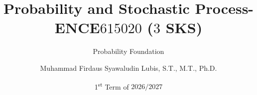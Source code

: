 \title[]{Probability and Stochastic Process-ENCE$615020$ ($3$ SKS)}
\subtitle{Probability Foundation}
\author[]{Muhammad Firdaus Syawaludin Lubis, S.T., M.T., Ph.D.}
\date[]{1\textsuperscript{st} Term of $2026/2027$}